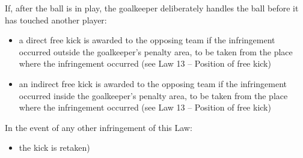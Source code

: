 {{If, after the ball is in play, the goalkeeper deliberately handles the
ball before it has touched another player:

\begin{itemize}
\item a direct free kick is awarded to the opposing team if the infringement
occurred outside the goalkeeper{\textquoteright}s penalty area, to be
taken from the place where the infringement occurred (see Law 13 --
Position of free kick)
\item an indirect free kick is awarded to the opposing team if the
infringement occurred inside the goalkeeper{\textquoteright}s penalty
area, to be taken from the place where the infringement occurred (see
Law 13 -- Position of free kick)
\end{itemize}

\bigskip

In the event of any other infringement of this Law:

\begin{itemize}
\item the kick is retaken) 
\end{itemize}
}
}